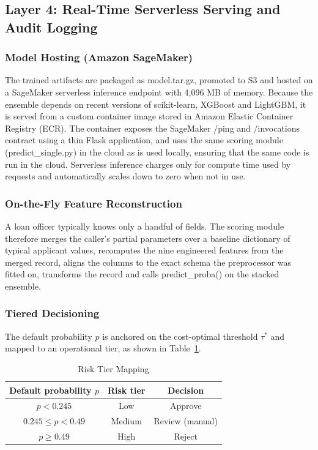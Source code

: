 \documentclass[conference]{IEEEtran}
\begin{document}
\subsection{Layer 4: Real-Time Serverless Serving and Audit Logging}
\subsubsection{Model Hosting (Amazon SageMaker)}
The trained artifacts are packaged as model.tar.gz, promoted to S3 and hosted on a SageMaker serverless inference endpoint with 4,096 MB of memory. Because the ensemble depends on recent versions of scikit-learn, XGBoost and LightGBM, it is served from a custom container image stored in Amazon Elastic Container Registry (ECR). The container exposes the SageMaker /ping and /invocations contract using a thin Flask application, and uses the same scoring module (predict\_single.py) in the cloud as is used locally, ensuring that the same code is run in the cloud. Serverless inference charges only for compute time used by requests and automatically scales down to zero when not in use.

\subsubsection{On-the-Fly Feature Reconstruction}
A loan officer typically knows only a handful of fields. The scoring module therefore merges the caller's partial parameters over a baseline dictionary of typical applicant values, recomputes the nine engineered features from the merged record, aligns the columns to the exact schema the preprocessor was fitted on, transforms the record and calls predict\_proba() on the stacked ensemble.

\subsubsection{Tiered Decisioning}
The default probability $p$ is anchored on the cost-optimal threshold $\tau^{*}$ and mapped to an operational tier, as shown in Table~\ref{tab:tiers}.

\begin{table}[htbp]
\caption{Risk Tier Mapping}
\begin{center}
\begin{tabular}{|c|c|c|}
\hline
\textbf{Default probability $p$} & \textbf{Risk tier} & \textbf{Decision} \\
\hline
$p < 0.245$ & Low & Approve \\
$0.245 \le p < 0.49$ & Medium & Review (manual) \\
$p \ge 0.49$ & High & Reject \\
\hline
\end{tabular}
\label{tab:tiers}
\end{center}
\end{table}
\end{document}
